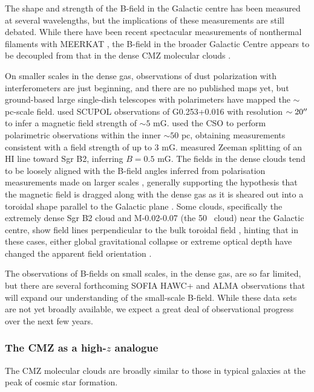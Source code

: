 The shape and strength of the B-field in the Galactic centre has been measured at several wavelengths, but the implications of these measurements are still debated.
While there have been recent spectacular measurements of nonthermal filaments with MEERKAT \citep{Heywood2022,Yusef-Zadeh2022}, the B-field in the broader Galactic Centre appears to be decoupled from that in the dense CMZ molecular clouds \citep{Morris2015}.

On smaller scales in the dense gas, observations of dust polarization with interferometers are just beginning, and there are no published maps yet, but ground-based large single-dish telescopes with polarimeters have mapped the $\sim$pc-scale field.
\citet{Pillai2015} used SCUPOL observations of G0.253+0.016 with resolution $\sim20\mbox{$^{\prime\prime}$}$ to infer a magnetic field strength of $\sim5$ mG.  
\citet{Chuss2003} used the CSO to perform polarimetric observations within the inner $\sim50$ pc, obtaining measurements consistent with a field strength of up to 3 mG.
\citet{Crutcher1996} measured Zeeman splitting of an HI line toward Sgr B2, inferring $B=0.5$ mG.
The fields in the dense clouds tend to be loosely aligned with the B-field angles inferred from polarisation measurements made on larger scales \citep[][with PILOT at 240 \um and ACT at 1-3mm, respectively]{Mangilli2019,Guan2021}, generally supporting the hypothesis that the magnetic field is dragged along with the dense gas as it is sheared out into a toroidal shape parallel to the Galactic plane \citep{Morris2015,Hu2022b}.
Some clouds, specifically the extremely dense Sgr B2 cloud and  M-0.02-0.07 (the 50 \kms\ cloud) near the Galactic centre, show field lines perpendicular to the bulk toroidal field \citep{Guan2021}, hinting that in these cases, either global gravitational collapse or extreme optical depth have changed the apparent field orientation \citep{Morris2015}.

The observations of B-fields on small scales, in the dense gas, are so far limited, but there are several forthcoming SOFIA HAWC+ \citep[e.g.][]{Hu2022,Hu2022b} and ALMA observations that will expand our understanding of the small-scale B-field.  While these data sets are not yet broadly available, we expect a great deal of observational progress over the next few years.

\subsubsection{The CMZ as a high-$z$ analogue}
\label{sec:environmentstuff}
The CMZ molecular clouds are broadly similar to those in typical galaxies at the peak of cosmic star formation.

